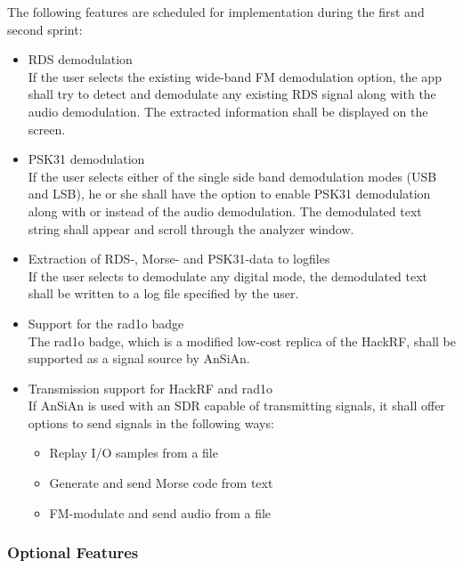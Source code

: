 The following features are scheduled for implementation during the first and
second sprint:
\begin{itemize}
	\item \ac{RDS} demodulation \\
		If the user selects the existing wide-band \ac{FM} demodulation option,
		the app shall try to detect and demodulate any existing \ac{RDS}
		signal along with the audio demodulation. The extracted information
		shall be displayed on the screen.
	\item \ac{PSK31} demodulation \\
		If the user selects either of the single side band demodulation modes
		(\ac{USB} and \ac{LSB}), he or she shall have the option to enable
		\ac{PSK31} demodulation along with or instead of the audio demodulation.
		The demodulated text string shall appear and scroll through the
		analyzer window.
	\item Extraction of RDS-, Morse- and \ac{PSK31}-data to logfiles \\
		If the user selects to demodulate any digital mode, the demodulated
		text shall be written to a log file specified by the user.
	\item Support for the rad1o badge \\
		The rad1o badge, which is a modified low-cost replica of the HackRF,
		shall be supported as a signal source by AnSiAn.
	\item Transmission support for HackRF and rad1o \\
		If \ac{AnSiAn} is used with an \ac{SDR} capable of transmitting signals,
		it shall offer options to send signals in the following ways:
		\begin{itemize}
			\item Replay I/O samples from a file
			\item Generate and send Morse code from text
			\item FM-modulate and send audio from a file
		\end{itemize}
\end{itemize}

\subsubsection{Optional Features}

